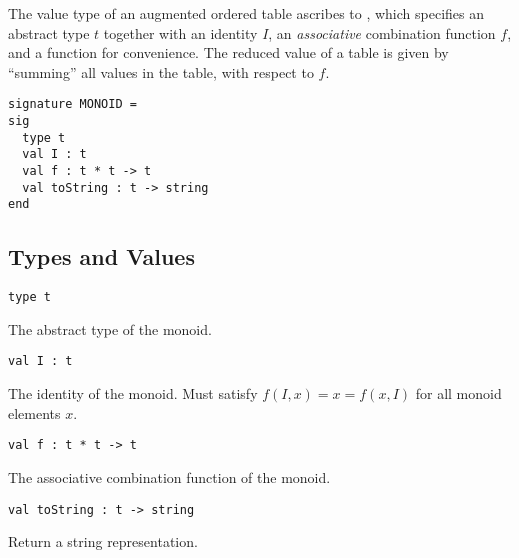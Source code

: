 \begin{gram}
The value type of an augmented ordered table ascribes to , which
specifies an abstract type $t$ together with an identity $I$, an
\emph{associative} combination function $f$, and a  function for
convenience. The reduced value of a table is given by ``summing'' all values in
the table, with respect to $f$.
\end{gram}

\begin{gram}[MONOID]
\label{gr:aug-ordtable-interface:MONOID}
\begin{verbatim}
signature MONOID =
sig
  type t
  val I : t
  val f : t * t -> t
  val toString : t -> string
end
\end{verbatim}
\end{gram}

\subsection{Types and Values}

\begin{gram}
\begin{verbatim}
type t
\end{verbatim}
The abstract type of the monoid.
\end{gram}

\begin{gram}[I]
\begin{verbatim}
val I : t
\end{verbatim}
The identity of the monoid. Must satisfy $f(I, x) = x = f(x, I)$ for all
monoid elements $x$.
\end{gram}

\begin{gram}[f]
\begin{verbatim}
val f : t * t -> t
\end{verbatim}
The associative combination function of the monoid.
\end{gram}

\begin{gram}[toString]
\begin{verbatim}
val toString : t -> string
\end{verbatim}
Return a string representation.
\end{gram}

